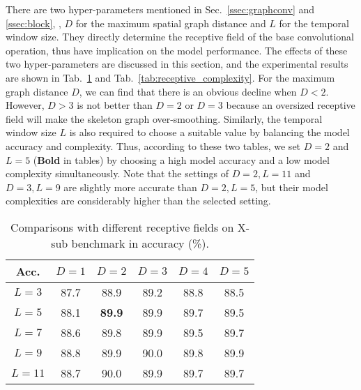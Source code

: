 \documentclass[10pt,journal,compsoc]{IEEEtran}
\begin{document}
There are two hyper-parameters mentioned in Sec.~\ref{ssec:graphconv} and \ref{ssec:block}, \ie, $D$ for the maximum spatial graph distance and $L$ for the temporal window size. They directly determine the receptive field of the base convolutional operation, thus have implication on the model performance. The effects of these two hyper-parameters are discussed in this section, and the experimental results are shown in Tab.~\ref{tab:receptive_acc} and Tab.~\ref{tab:receptive_complexity}. For the maximum graph distance $D$, we can find that there is an obvious decline when $D<2$. However, $D>3$ is not better than $D=2$ or $D=3$ because an oversized receptive field will make the skeleton graph over-smoothing. Similarly, the temporal window size $L$ is also required to choose a suitable value by balancing the model accuracy and complexity. Thus, according to these two tables, we set $D=2$ and $L=5$ ({\bf Bold} in tables) by choosing a high model accuracy and a low model complexity simultaneously. Note that the settings of $D=2,L=11$ and $D=3,L=9$ are slightly more accurate than $D=2,L=5$, but their model complexities are considerably higher than the selected setting.

\begin{table}[ht]
  \caption{Comparisons with different receptive fields on X-sub benchmark in accuracy (\%).}
  \label{tab:receptive_acc}
  \vspace{-0.4cm}
  \centering
  \setlength{\tabcolsep}{4pt}
  \renewcommand{\arraystretch}{1.2}
  \begin{tabular}{c|ccccc}
  \toprule
  Acc. & $D=1$ & $D=2$ & $D=3$ & $D=4$ & $D=5$ \\
  \midrule
  $L=3$ & 87.7 & 88.9 & 89.2 & 88.8 & 88.5 \\
  $L=5$ & 88.1 & {\bf 89.9} & 89.9 & 89.7 & 89.5 \\
  $L=7$ & 88.6 & 89.8 & 89.9 & 89.5 & 89.7 \\
  $L=9$ & 88.8 & 89.9 & 90.0 & 89.8 & 89.9 \\
  $L=11$ & 88.7 & 90.0 & 89.9 & 89.7 & 89.7 \\
  \bottomrule
  \end{tabular}
\end{table}
\end{document}

